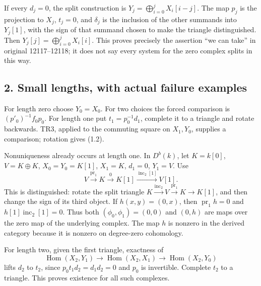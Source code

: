 If every \(d_j=0\),\allowbreak{} the split construction is \(Y_j=\bigoplus_{i=0}^jX_i[i-j]\). The map \(p_j\) is the projection to \(X_j\),\allowbreak{} \(t_j=0\),\allowbreak{} and \(\delta_j\) is the inclusion of the other summands into \(Y_j[1]\),\allowbreak{} with the sign of that summand chosen to make the triangle distinguished. Then \(Y_j[j]=\bigoplus_{i=0}^jX_i[i]\). This proves precisely the assertion ``we can take'' in original 12117–\allowbreak{}12118; it does not say every system for the zero complex splits in this way.

\subsection{\texorpdfstring{2. Small lengths,\allowbreak{} with actual failure examples}{2. Small  with actual failure examples}}\label{proofs-12008-12370-small-lengths-with-actual-failure-examples}

For length zero choose \(Y_0=X_0\). For two choices the forced comparison is \((p'_0)^{-1}f_0p_0\). For length one put \(t_1=p_0^{-1}d_1\),\allowbreak{} complete it to a triangle and rotate backwards. TR3,\allowbreak{} applied to the commuting square on \(X_1,Y_0\),\allowbreak{} supplies a comparison; rotation gives (1.2)\allowbreak{}.

Nonuniqueness already occurs at length one. In \(D^b(k)\),\allowbreak{} let \(K=k[0]\),\allowbreak{} \(V=K\oplus K\),\allowbreak{} \(X_0=Y_0=K[1]\),\allowbreak{} \(X_1=K\),\allowbreak{} \(d_1=0\),\allowbreak{} \(Y_1=V\). Use \[
V\xrightarrow{\operatorname{pr}_1}K\xrightarrow{0}K[1]
 \xrightarrow{\operatorname{inc}_2[1]}V[1]. \tag{2.1}
\] This is distinguished:\allowbreak{} rotate the split triangle \(K\xrightarrow{\operatorname{inc}_2}V\xrightarrow{\operatorname{pr}_1}K\to K[1]\),\allowbreak{} and then change the sign of its third object. If \(h(x,y)=(0,x)\),\allowbreak{} then \(\operatorname{pr}_1h=0\) and \(h[1]\operatorname{inc}_2[1]=0\). Thus both \((\phi_0,\phi_1)=(0,0)\) and \((0,h)\) are maps over the zero map of the underlying complex. The map \(h\) is nonzero in the derived category because it is nonzero on degree-zero cohomology.

For length two,\allowbreak{} given the first triangle,\allowbreak{} exactness of \[
\operatorname{Hom}(X_2,Y_1)\longrightarrow
\operatorname{Hom}(X_2,X_1)\longrightarrow
\operatorname{Hom}(X_2,Y_0)
\] lifts \(d_2\) to \(t_2\),\allowbreak{} since \(p_0t_1d_2=d_1d_2=0\) and \(p_0\) is invertible. Complete \(t_2\) to a triangle. This proves existence for all such complexes.

